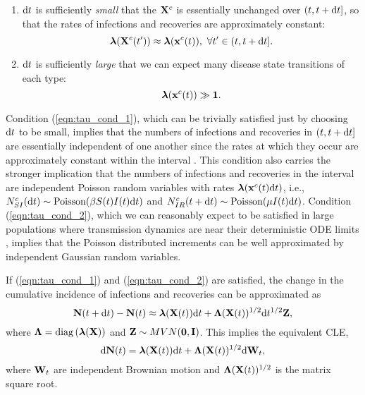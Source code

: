\begin{enumerate}
	\item $ \mathrm{d} t $ is sufficiently \textit{small} that the $ \mathbf{X}^c $ is essentially unchanged over $ (t,t+\mathrm{d} t] $, so that the rates of infections and recoveries are approximately constant: 
	\begin{equation}\label{eqn:tau_cond_1}
	\boldsymbol{\lambda}(\mathbf{X}^c(t^\prime)) \approx \boldsymbol{\lambda}(\mathbf{x}^c(t)),\ \forall t^\prime \in (t,t+\mathrm{d} t].
	\end{equation}
	\item $ \mathrm{d} t $ is sufficiently \textit{large} that we can expect many disease state transitions of each type:
	\begin{equation}\label{eqn:tau_cond_2}
	\boldsymbol{\lambda}(\mathbf{x}^c(t)) \gg \boldsymbol{1}.
	\end{equation}
\end{enumerate}

Condition (\ref{eqn:tau_cond_1}), which can be trivially satisfied just by choosing $ \mathrm{d} t $ to be small, implies that the numbers of infections and recoveries in $ (t,t+\mathrm{d} t] $ are essentially independent of one another since the rates at which they occur are approximately constant within the interval \cite{gillespie2000chemical}. This condition also carries the stronger implication that the numbers of infections and recoveries in the interval are independent Poisson random variables with rates $ \boldsymbol{\lambda}(\mathbf{x}^c(t)\mathrm{d} t) $, i.e., $ N^c_{SI}(\mathrm{d} t) \sim \mathrm{Poisson}(\beta S(t)I(t)\mathrm{d} t) $ and $ N^c_{IR}(t+\mathrm{d} t) \sim \mathrm{Poisson}(\mu I(t)\mathrm{d} t) $. Condition (\ref{eqn:tau_cond_2}), which we can reasonably expect to be satisfied in large populations where transmission dynamics are near their deterministic ODE limits \cite{wallace2012linear}, implies that the Poisson distributed increments can be well approximated by independent Gaussian random variables. 

If (\ref{eqn:tau_cond_1}) and (\ref{eqn:tau_cond_2}) are satisfied, the change in the cumulative incidence of infections and recoveries can be approximated as 
\begin{equation}
\mathbf{N}(t+\mathrm{d} t) - \mathbf{N}(t) \approx \boldsymbol{\lambda}(\mathbf{X}(t))\mathrm{d} t + \boldsymbol{\Lambda}(\mathbf{X}(t))^{1/2}\mathrm{d} t^{1/2}\mathbf{Z},
\end{equation}
where $ \boldsymbol{\Lambda} = \mathrm{diag}\left (\boldsymbol{\lambda}(\mathbf{X}) \right )$ and $ \mathbf{Z}\sim MVN(\boldsymbol{0},\mathbf{I}) $. This implies the equivalent CLE,
\begin{equation}
\label{eqn:sir_cle_X}
\mathrm{d} \mathbf{N}(t) = \boldsymbol{\lambda}(\mathbf{X}(t))\mathrm{d} t + \boldsymbol{\Lambda}(\mathbf{X}(t))^{1/2}\mathrm{d}\mathbf{W}_t, 
\end{equation}
where $ \mathbf{W}_t $ are independent Brownian motion and $ \boldsymbol{\Lambda}(\mathbf{X}(t))^{1/2} $ is the matrix square root. 

